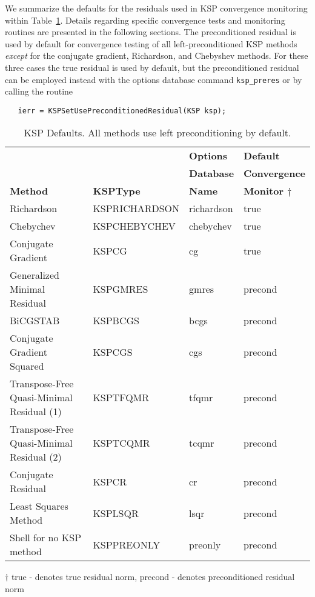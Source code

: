 We summarize the defaults for the residuals used in KSP convergence
monitoring within Table~\ref{tab:kspdefaults}.  Details regarding
specific convergence tests and monitoring routines are presented in
the following sections.  The preconditioned residual is used by
default for convergence testing of all left-preconditioned KSP
methods {\em except} for the conjugate gradient, Richardson, and
Chebyshev methods.  For these three cases the true residual is used by
default, but the preconditioned residual can be employed instead with
the options database command {\tt ksp\_preres} or by calling the routine
\begin{verbatim}
   ierr = KSPSetUsePreconditionedResidual(KSP ksp);
\end{verbatim}

\begin{table}
\begin{center}
\begin{tabular}{llll}
& & {\bf Options}       & {\bf Default}\\
& & {\bf Database}      & {\bf Convergence}\\
{\bf Method}    &{\bf KSPType}  & {\bf Name}    & {\bf Monitor $ \dagger $}\\
\hline
Richardson                                & KSPRICHARDSON & richardson  & true\\
Chebychev                                 & KSPCHEBYCHEV  & chebychev   & true\\
Conjugate Gradient \cite{hs:52}           & KSPCG         & cg          & true\\
Generalized Minimal Residual \cite{ss:86} & KSPGMRES      & gmres       & precond\\
BiCGSTAB \cite{v:92}                      & KSPBCGS       & bcgs        & precond \\
Conjugate Gradient Squared \cite{so:89}   & KSPCGS        & cgs         & precond \\
Transpose-Free Quasi-Minimal Residual (1) \cite{f:93} & KSPTFQMR & tfqmr & precond \\
Transpose-Free Quasi-Minimal Residual (2) & KSPTCQMR & tcqmr & precond \\
Conjugate Residual                        & KSPCR         & cr          & precond \\
Least Squares Method                      & KSPLSQR       & lsqr        & precond \\
Shell for no KSP method                   & KSPPREONLY    & preonly     & precond \\
\hline
\end{tabular}
\medskip \medskip
$ \dagger $ true - denotes true residual norm, precond - denotes preconditioned residual norm
\end{center}
\caption{KSP Defaults.  All methods use left preconditioning by default.}
\label{tab:kspdefaults}
\end{table}

